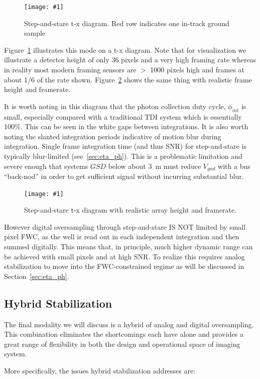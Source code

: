 \documentclass[10pt,journal]{IEEEtran}  %
\newcommand{\includefigure}[3]
{
  \begin{figure}[h!]
  \centering
  \texttt{[image: \#1]}
  \caption[]{#3}
  \label{#2}
  \end{figure}
}
\begin{document}
\includefigure{figures/step_stare.pgf}{fig:step_stare}{Step-and-stare t-x diagram.  Red row indicates one in-track ground sample}

Figure~\ref{fig:step_stare} illustrates this mode on a t-x diagram.  Note that for visualization we illustrate a detector height of only 36 pixels and a very high framing rate whereas in reality most modern framing sensors are $>$ 1000 pixels high and frames at about 1/6 of the rate shown.  Figure~\ref{fig:step_stare_real} shows the same thing with realistic frame height and framerate.

It is worth noting in this diagram that the photon collection duty cycle, $\phi_{int}$ is small, especially compared with a traditional TDI system which is essentially 100\%.  This can be seen in the white gaps between integrations.  It is also worth noting the slanted integration periods indicative of motion blur during integration.  Single frame integration time (and thus SNR) for step-and-stare is typically blur-limited (see~\ref{sec:eta_ph}).  This is a problematic limitation and severe enough that systems $GSD$ below about 3~m must reduce $V_{gnd}$ with a bus ``back-nod'' in order to get sufficient signal without incurring substantial blur.

\includefigure{figures/step_stare_real.pgf}{fig:step_stare_real}{Step-and-stare t-x diagram with realistic array height and framerate.}

However digital oversampling through step-and-stare IS NOT limited by small pixel FWC, as the well is read out in each independent integration and then summed digitally.  This means that, in principle, much higher dynamic range can be achieved with small pixels and at high SNR.  To realize this requires analog stabilization to move into the FWC-constrained regime as will be discussed in Section~\ref{sec:eta_ph}.


\subsection{Hybrid Stabilization}

The final modality we will discuss is a hybrid of analog and digital oversampling.  This combination eliminates the shortcomings each have alone and provides a great range of flexibility in both the design and operational space of imaging system.

More specifically, the issues hybrid stabilization addresses are:
\end{document}
